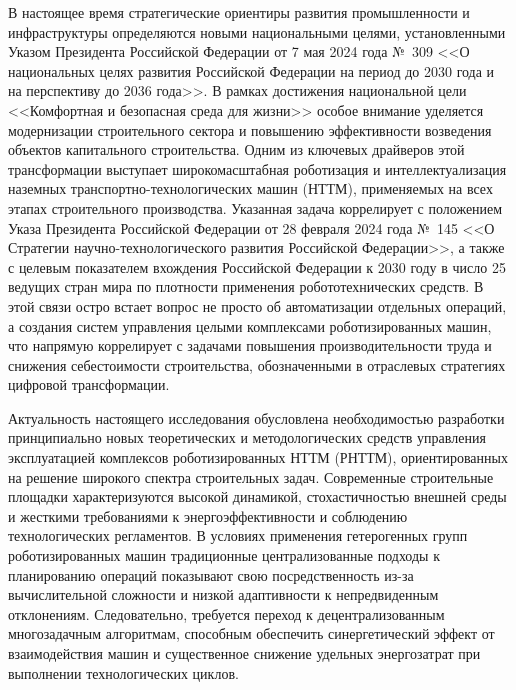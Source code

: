 
{\actuality} В настоящее время стратегические ориентиры развития промышленности и инфраструктуры определяются новыми национальными целями, установленными Указом Президента Российской Федерации от 7 мая 2024 года №~309 <<О национальных целях развития Российской Федерации на период до 2030 года и на перспективу до 2036 года>>. В рамках достижения национальной цели <<Комфортная и безопасная среда для жизни>> особое внимание уделяется модернизации строительного сектора и повышению эффективности возведения объектов капитального строительства. Одним из ключевых драйверов этой трансформации выступает широкомасштабная роботизация и интеллектуализация наземных транспортно-технологических машин (НТТМ), применяемых на всех этапах строительного производства. Указанная задача коррелирует с положением Указа Президента Российской Федерации от 28 февраля 2024 года №~145 <<О Стратегии научно-технологического развития Российской Федерации>>, а также с целевым показателем вхождения Российской Федерации к 2030 году в число 25 ведущих стран мира по плотности применения робототехнических средств. В этой связи остро встает вопрос не просто об автоматизации отдельных операций, а создания систем управления целыми комплексами роботизированных машин, что напрямую коррелирует с задачами повышения производительности труда и снижения себестоимости строительства, обозначенными в отраслевых стратегиях цифровой трансформации.

Актуальность настоящего исследования обусловлена необходимостью разработки принципиально новых теоретических и методологических средств управления эксплуатацией комплексов роботизированных НТТМ (РНТТМ), ориентированных на решение широкого спектра строительных задач. Современные строительные площадки характеризуются высокой динамикой, стохастичностью внешней среды и жесткими требованиями к энергоэффективности и соблюдению технологических регламентов. В условиях применения гетерогенных групп роботизированных машин традиционные централизованные подходы к планированию операций показывают свою посредственность из-за вычислительной сложности и низкой адаптивности к непредвиденным отклонениям. Следовательно, требуется переход к децентрализованным многозадачным алгоритмам, способным обеспечить синергетический эффект от взаимодействия машин и существенное снижение удельных энергозатрат при выполнении технологических циклов.

